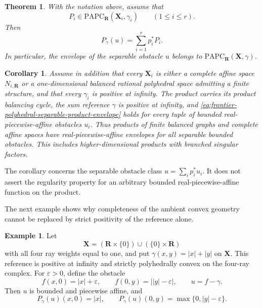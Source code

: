 \documentclass[11pt,a4paper]{article}
\newtheorem{theorem}{Theorem}[section]
\newtheorem{corollary}[corollary]{Corollary}
\theoremstyle{definition}
\newtheorem{example}[example]{Example}
\theoremstyle{remark}
\begin{document}
\begin{theorem}
\label{thm:frontier-polyhedral-separable-product-envelope}
With the notation above, assume that
\[
 P_i\in
 \mathrm{PAPC}_{\mathbf R}(\mathbf X_i,\gamma_i)
 \qquad(1\leq i\leq r).
\]
Then
\[
 P_\gamma(u)=\sum_{i=1}^r p_i^*P_i.
 \tag{*}\label{eq:frontier-polyhedral-separable-product-envelope}
\]
In particular, the envelope of the separable obstacle $u$ belongs to
$\mathrm{PAPC}_{\mathbf R}(\mathbf X,\gamma)$.
\end{theorem}

\begin{corollary}
\label{cor:frontier-polyhedral-graph-affine-separable-regularity}
Assume in addition that every $\mathbf X_i$ is either a complete affine
space $N_{i,\mathbf R}$ or a one-dimensional balanced rational polyhedral
space admitting a finite structure, and that every $\gamma_i$ is positive
at infinity.  The product carries its product balancing cycle, the sum
reference $\gamma$ is positive at infinity, and
\eqref{eq:frontier-polyhedral-separable-product-envelope} holds for every
tuple of bounded real-piecewise-affine obstacles $u_i$.
Thus products of finite balanced graphs and complete affine spaces have
real-piecewise-affine envelopes for all separable bounded obstacles.  This
includes higher-dimensional products with branched singular factors.
\end{corollary}

The corollary concerns the separable obstacle class
$u=\sum_i p_i^*u_i$.  It does not assert the regularity property for an
arbitrary bounded real-piecewise-affine function on the product.








The next example shows why completeness of the ambient convex geometry
cannot be replaced by strict positivity of the reference alone.

\begin{example}\label{ex:frontier-polyhedral-cross-orthogonality}
Let
\[
 \mathbf X=(\mathbf R\times\{0\})\cup(\{0\}\times\mathbf R)
\]
with all four ray weights equal to one, and put
\(\gamma(x,y)=|x|+|y|\) on \(\mathbf X\).  This reference is positive at
infinity and strictly polyhedrally convex on the four-ray complex.  For
\(\varepsilon>0\), define the obstacle
\[
 f(x,0)=|x|+\varepsilon,
 \qquad
 f(0,y)=\bigl||y|-\varepsilon\bigr|,
 \qquad u=f-\gamma.
\]
Then \(u\) is bounded and piecewise affine, and
\[
 P_\gamma(u)(x,0)=|x|,
 \qquad
 P_\gamma(u)(0,y)=\max\{0,|y|-\varepsilon\}.
\]
\end{example}
\end{document}
